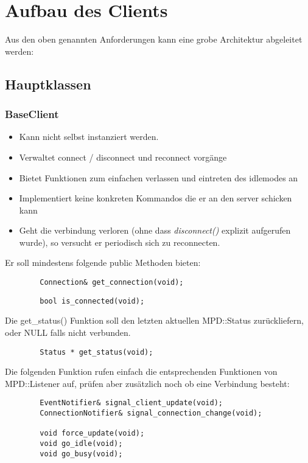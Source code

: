 \section{Aufbau des Clients}

Aus den oben genannten Anforderungen kann eine grobe Architektur abgeleitet werden:


\subsection{Hauptklassen}

\subsubsection{BaseClient}
\begin{itemize}
    \item Kann nicht selbst instanziert werden.
    \item Verwaltet connect / disconnect und reconnect vorgänge
    \item Bietet Funktionen zum einfachen verlassen und eintreten des idlemodes an 
    \item Implementiert keine konkreten Kommandos die er an den server schicken kann
    \item Geht die verbindung verloren (ohne dass \emph{disconnect()} explizit aufgerufen wurde),
        so versucht er periodisch sich zu reconnecten.
\end{itemize}
Er soll mindestens folgende public Methoden bieten:

\begin{verbatim}
        Connection& get_connection(void);
\end{verbatim}

\begin{verbatim}
        bool is_connected(void);
\end{verbatim}
Die get\_status() Funktion soll den letzten aktuellen MPD::Status zurückliefern,
oder NULL falls nicht verbunden. 
\begin{verbatim}        
        Status * get_status(void);
\end{verbatim}

Die folgenden Funktion rufen einfach die entsprechenden Funktionen von MPD::Listener auf,
prüfen aber zusätzlich noch ob eine Verbindung besteht:
\begin{verbatim}
        EventNotifier& signal_client_update(void);
        ConnectionNotifier& signal_connection_change(void);

        void force_update(void);
        void go_idle(void);
        void go_busy(void);
\end{verbatim}


